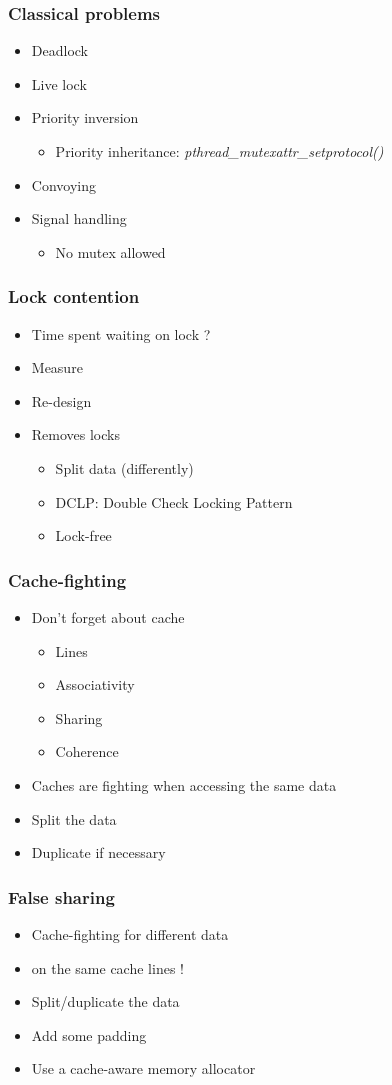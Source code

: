 \begin{frame}
  \frametitle{Classical problems}

  \begin{itemize}
  \item Deadlock
  \item Live lock
  \item Priority inversion
    \begin{itemize}
    \item Priority inheritance: \emph{pthread\_mutexattr\_setprotocol()}
    \end{itemize}
  \item Convoying
  \item Signal handling
    \begin{itemize}
    \item No mutex allowed
    \end{itemize}
  \end{itemize}
\end{frame}


\begin{frame}
  \frametitle{Lock contention}

  \begin{itemize}
  \item Time spent waiting on lock ?
  \item Measure
  \item Re-design
  \item Removes locks
    \begin{itemize}
    \item Split data (differently)
    \item DCLP: Double Check Locking Pattern
    \item Lock-free
    \end{itemize}
  \end{itemize}
\end{frame}

\begin{frame}
  \frametitle{Cache-fighting}

  \begin{itemize}
  \item Don't forget about cache
    \begin{itemize}
    \item Lines
    \item Associativity
    \item Sharing
    \item Coherence
    \end{itemize}
  \item Caches are fighting when accessing the same data
  \item Split the data
  \item Duplicate if necessary
  \end{itemize}
\end{frame}

\begin{frame}
  \frametitle{False sharing}

  \begin{itemize}
  \item Cache-fighting for different data
  \item on the same cache lines !
  \item Split/duplicate the data
  \item Add some padding
  \item Use a cache-aware memory allocator
  \end{itemize}
\end{frame}
